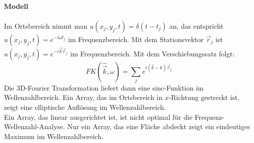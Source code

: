 \paragraph{Modell} Im Ortsbereich nimmt man $u(x_j,y_j,t) = \delta(t-t_j)$ an, das entspricht $u(x_j,y_j,t)= e^{-i\omega t_{j}}$ im Frequenzbereich. Mit dem Stationsvektor $\vec{r}_j$ ist $u(x_j,y_j,t) = e^{-i\vec{k}\vec{r}_j}$  im Frequenzbereich.
Mit dem Verschiebungssatz folgt:
\begin{equation}
FK(\hat{\vec{k}},\omega) = \sum_{j} e^{i( \hat{k}-k)\vec{r}_j}
\end{equation}
Die 3D-Fourier Transformation liefert dann eine sinc-Funktion im Wellenzahlbereich. Ein Array, das im Ortsbereich  in $x$-Richtung gestreckt ist, zeigt eine elliptische Auflösung im Wellenzahlbereich.\\
Ein Array, das linear ausgerichtet ist, ist nicht optimal für die Frequenz-Wellenzahl-Analyse. Nur ein Array, das eine Fläche abdeckt zeigt ein eindeutiges Maximum im Wellenzahlbereich.
